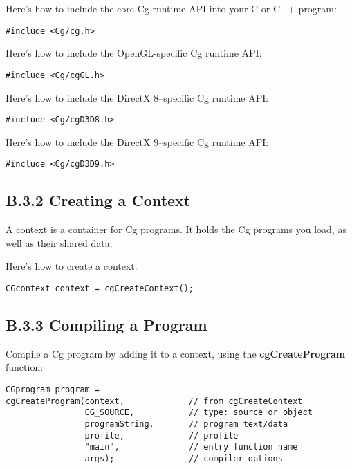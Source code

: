 \documentclass[../main.tex]{subfiles}
\begin{document}
Here's how to include the core Cg runtime API into your C or C++ program:

\FloatBarrier
\begin{lstlisting}
#include <Cg/cg.h>
\end{lstlisting}
\FloatBarrier

Here's how to include the OpenGL-specific Cg runtime API:

\FloatBarrier
\begin{lstlisting}
#include <Cg/cgGL.h>
\end{lstlisting}
\FloatBarrier

Here's how to include the DirectX 8–specific Cg runtime API:

\FloatBarrier
\begin{lstlisting}
#include <Cg/cgD3D8.h>
\end{lstlisting}
\FloatBarrier

Here's how to include the DirectX 9–specific Cg runtime API:

\FloatBarrier
\begin{lstlisting}
#include <Cg/cgD3D9.h>
\end{lstlisting}
\FloatBarrier

\subsection{B.3.2 Creating a Context}

A context is a container for Cg programs. It holds the Cg programs you load, as well as their shared data.

Here's how to create a context:

\FloatBarrier
\begin{lstlisting}
CGcontext context = cgCreateContext();
\end{lstlisting}
\FloatBarrier

\subsection{B.3.3 Compiling a Program}

Compile a Cg program by adding it to a context, using the \textbf{cgCreateProgram} function:

\FloatBarrier
\begin{lstlisting}
CGprogram program =
cgCreateProgram(context,             // from cgCreateContext
                CG_SOURCE,           // type: source or object
                programString,       // program text/data
                profile,             // profile
                "main",              // entry function name
                args);               // compiler options
\end{lstlisting}
\FloatBarrier
\end{document}
